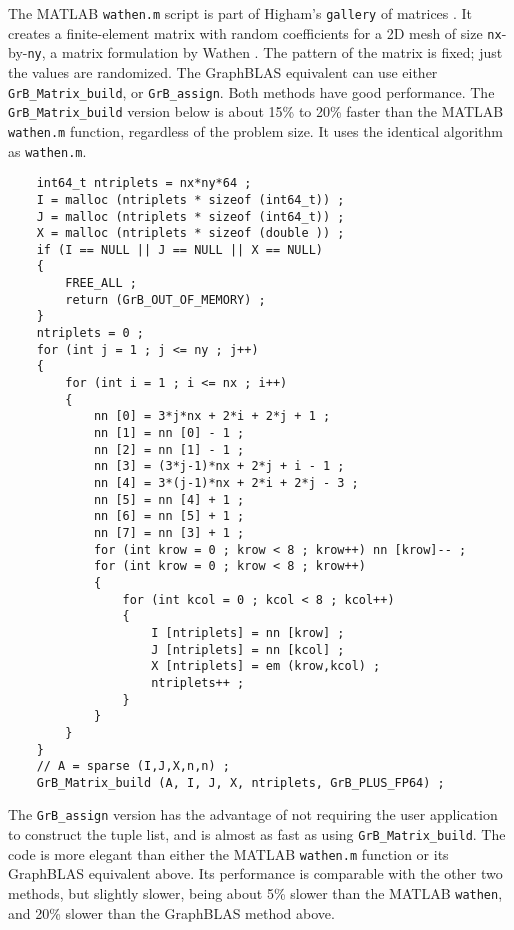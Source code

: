 \documentclass[12pt]{article}
\begin{document}
The MATLAB \verb'wathen.m' script is part of Higham's \verb'gallery' of
matrices \cite{Higham}.  It creates a finite-element matrix with random
coefficients for a 2D mesh of size \verb'nx'-by-\verb'ny', a matrix formulation
by Wathen \cite{Wathen}.  The pattern of the matrix is fixed; just the values
are randomized.  The GraphBLAS equivalent can use either
\verb'GrB_Matrix_build', or \verb'GrB_assign'.  Both methods have good
performance.  The \verb'GrB_Matrix_build' version below is about 15\% to 20\%
faster than the MATLAB \verb'wathen.m' function, regardless of the problem
size.  It uses the identical algorithm as \verb'wathen.m'.

    {\footnotesize
    \begin{verbatim}
    int64_t ntriplets = nx*ny*64 ;
    I = malloc (ntriplets * sizeof (int64_t)) ;
    J = malloc (ntriplets * sizeof (int64_t)) ;
    X = malloc (ntriplets * sizeof (double )) ;
    if (I == NULL || J == NULL || X == NULL)
    {
        FREE_ALL ;
        return (GrB_OUT_OF_MEMORY) ;
    }
    ntriplets = 0 ;
    for (int j = 1 ; j <= ny ; j++)
    {
        for (int i = 1 ; i <= nx ; i++)
        {
            nn [0] = 3*j*nx + 2*i + 2*j + 1 ;
            nn [1] = nn [0] - 1 ;
            nn [2] = nn [1] - 1 ;
            nn [3] = (3*j-1)*nx + 2*j + i - 1 ;
            nn [4] = 3*(j-1)*nx + 2*i + 2*j - 3 ;
            nn [5] = nn [4] + 1 ;
            nn [6] = nn [5] + 1 ;
            nn [7] = nn [3] + 1 ;
            for (int krow = 0 ; krow < 8 ; krow++) nn [krow]-- ;
            for (int krow = 0 ; krow < 8 ; krow++)
            {
                for (int kcol = 0 ; kcol < 8 ; kcol++)
                {
                    I [ntriplets] = nn [krow] ;
                    J [ntriplets] = nn [kcol] ;
                    X [ntriplets] = em (krow,kcol) ;
                    ntriplets++ ;
                }
            }
        }
    }
    // A = sparse (I,J,X,n,n) ;
    GrB_Matrix_build (A, I, J, X, ntriplets, GrB_PLUS_FP64) ; \end{verbatim}}

The \verb'GrB_assign' version has the advantage of not requiring the
user application to construct the tuple list, and is almost as fast as using
\verb'GrB_Matrix_build'.  The code is more elegant than either the MATLAB
\verb'wathen.m' function or its GraphBLAS equivalent above.  Its performance is
comparable with the other two methods, but slightly slower, being about 5\%
slower than the MATLAB \verb'wathen', and 20\% slower than the GraphBLAS
method above.
\end{document}

